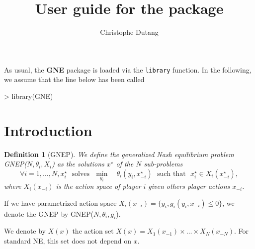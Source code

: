 \documentclass[11pt]{article}
\title{User guide for the \pkg{GNE} package}
\author{Christophe Dutang}
\newcommand{\pkg}{\textbf}
\newcommand{\code}{\texttt}
\newcommand{\txtm}[1]{\textrm{~~#1~~}}
\newtheorem{mydef}{Definition}
\begin{document}


\maketitle


As usual, the \pkg{GNE} package is loaded via the \code{library} function. In the following, we assume that the line below has been called
\begin{Schunk}
\begin{Sinput}
> library(GNE)
\end{Sinput}
\end{Schunk}

\section{Introduction}

\begin{mydef}[GNEP]
We define the generalized Nash equilibrium problem GNEP($N, \theta_i, X_i$) as the solutions $x^\star$ of the $N$ sub-problems
$$
\forall i = 1, \dots, N, x_i^\star \txtm{solves} 
\underset{ y_i }{\min} 
\quad
\theta_i(y_i, x_{-i}^\star)
\txtm{such that} x_i^\star \in X_i(x_{-i}^\star),
$$
where $X_i(x_{-i})$ is the action space of player $i$ given others player actions $x_{-i}$.
\end{mydef}

If we have parametrized action space $X_i(x_{-i}) = \{ y_i, g_i(y_i, x_{-i}) \leq 0  \}$, we denote the GNEP by  GNEP($N, \theta_i, g_i$).

We denote by $X(x) $ the action set $X(x) = X_1(x_{-1}) \times \dots \times X_N(x_{-N})$. For standard NE, this set does not depend on $x$.
\end{document}
